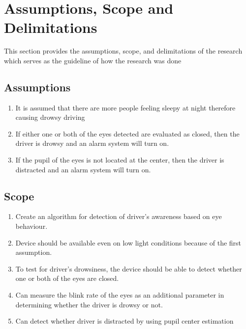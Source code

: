 \section{Assumptions, Scope and Delimitations}

This section provides the assumptions, scope, and delimitations of the research which serves as the guideline of how the research was done

\subsection{Assumptions}
\begin{enumerate}
	
	\item It is assumed that there are more people feeling sleepy at night therefore causing drowsy driving
	
	\item If either one or both of the eyes detected are evaluated as closed, then the driver is drowsy and an alarm system will turn on.
	
	\item If the pupil of the eyes is not located at the center, then the driver is distracted and an alarm system will turn on.
		
\end{enumerate}

\subsection{Scope}
\begin{enumerate}
	
	\item Create an algorithm for detection of driver’s awareness based on eye behaviour.
	
	\item Device should be available even on low light conditions because of the first assumption.
	
	\item To test for driver’s drowsiness, the device should be able to detect whether one or both of the eyes are closed.
	
	\item Can measure the blink rate of the eyes as an additional parameter in determining whether the driver is drowsy or not.
	
	\item Can detect whether driver is distracted by using pupil center estimation
		
\end{enumerate}

